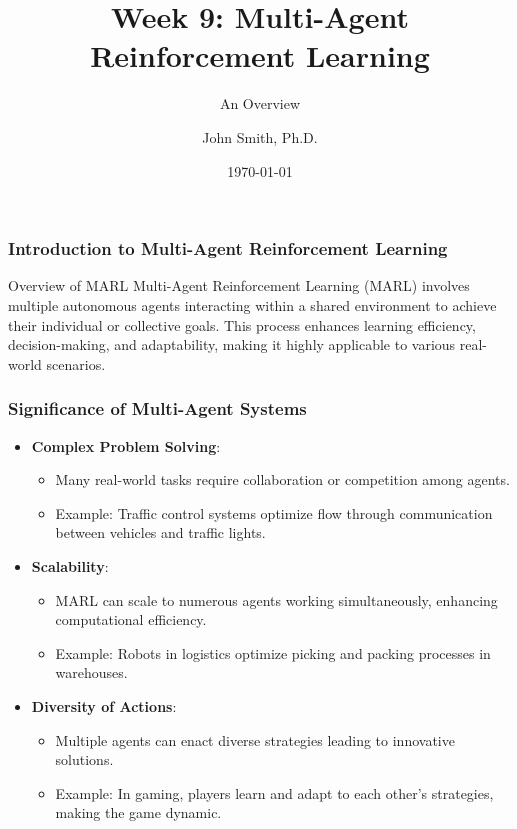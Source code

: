 \documentclass[aspectratio=169]{beamer}
\title[Multi-Agent RL]{Week 9: Multi-Agent Reinforcement Learning}
\subtitle{An Overview}
\author[J. Smith]{John Smith, Ph.D.}
\institute[University Name]{
  Department of Computer Science\\
  University Name\\
  \vspace{0.3cm}
  Email: email@university.edu\\
  Website: www.university.edu
}
\date{\today}
\begin{document}
\frame{\titlepage}

\begin{frame}[fragile]
    \frametitle{Introduction to Multi-Agent Reinforcement Learning}
    \begin{block}{Overview of MARL}
        Multi-Agent Reinforcement Learning (MARL) involves multiple autonomous agents interacting within a shared environment to achieve their individual or collective goals. This process enhances learning efficiency, decision-making, and adaptability, making it highly applicable to various real-world scenarios.
    \end{block}
\end{frame}

\begin{frame}[fragile]
    \frametitle{Significance of Multi-Agent Systems}
    \begin{itemize}
        \item \textbf{Complex Problem Solving}:
        \begin{itemize}
            \item Many real-world tasks require collaboration or competition among agents. 
            \item Example: Traffic control systems optimize flow through communication between vehicles and traffic lights.
        \end{itemize}
        
        \item \textbf{Scalability}:
        \begin{itemize}
            \item MARL can scale to numerous agents working simultaneously, enhancing computational efficiency.
            \item Example: Robots in logistics optimize picking and packing processes in warehouses.
        \end{itemize}
        
        \item \textbf{Diversity of Actions}:
        \begin{itemize}
            \item Multiple agents can enact diverse strategies leading to innovative solutions.
            \item Example: In gaming, players learn and adapt to each other’s strategies, making the game dynamic.
        \end{itemize}
    \end{itemize}
\end{frame}
\end{document}
